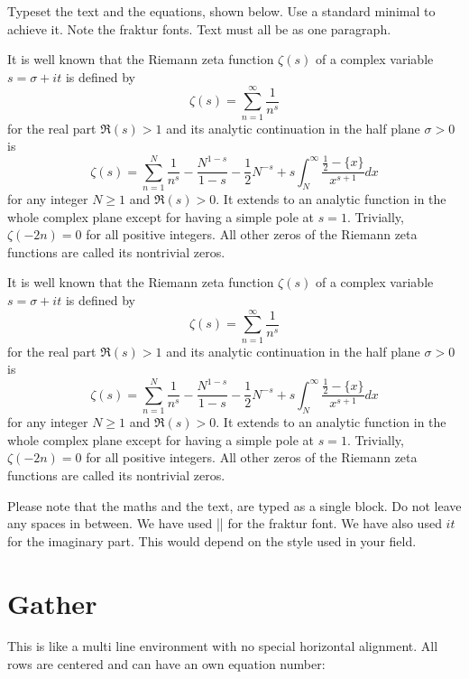 {\begin{casestudy}{%
Typeset the text and the equations, shown below. Use a standard minimal to achieve it. Note the fraktur fonts. Text must all be as one paragraph.}

It is well known that the Riemann zeta function $\zeta(s)$ of a complex variable $s=\sigma+it$ is defined by
\[
\zeta(s)=\sum_{n=1}^{\infty}\frac{1}{n^{s}}
\]
for the real part $\mathfrak{R}(s)>1$ and its analytic continuation in the half plane $\sigma>0$ is
\begin{equation}\label{func:zeta}
\zeta(s)=\sum_{n=1}^{N}\frac{1}{n^{s}}-\frac{N^{1-s}}{1-s}-\frac{1}{2}N^{-s}
+s\int_{N}^{\infty}\frac{\frac{1}{2}-\{x\}}{x^{s+1}}dx
\end{equation}
for any integer $N\geq1$ and $\mathfrak{R}(s)>0$.
It extends to an analytic function in the whole complex plane except for having a simple pole at $s=1$. Trivially, $\zeta(-2n)=0$ for all positive integers. All other zeros of the Riemann zeta functions are called its nontrivial zeros.
\bottomline

\begin{teX}
It is well known that the Riemann zeta function $\zeta(s)$ of a complex variable $s=\sigma+it$ is defined by
\[
\zeta(s)=\sum_{n=1}^{\infty}\frac{1}{n^{s}}
\]
for the real part $\mathfrak{R}(s)>1$ and its analytic continuation in the half plane $\sigma>0$ is
\begin{equation}\label{func:zeta}
\zeta(s)=\sum_{n=1}^{N}\frac{1}{n^{s}}-\frac{N^{1-s}}{1-s}-\frac{1}{2}N^{-s}
+s\int_{N}^{\infty}\frac{\frac{1}{2}-\{x\}}{x^{s+1}}dx
\end{equation}
for any integer $N\geq1$ and $\mathfrak{R}(s)>0$.
It extends to an analytic function in the whole complex plane except for having a simple pole at $s=1$. Trivially, $\zeta(-2n)=0$ for all positive integers. All other zeros of the Riemann zeta functions are called its nontrivial zeros.
\end{teX}

Please note that the maths and the text, are typed as a single block. Do not leave any spaces in between. We have used |\mathfrak| for the fraktur font. We have also used $it$ for the imaginary part. This would depend on the style used in your field. 
\end{casestudy}

\clearpage
\section{Gather}
This is like a multi line environment with no special horizontal alignment. All rows
are centered and can have an own equation number:

}
